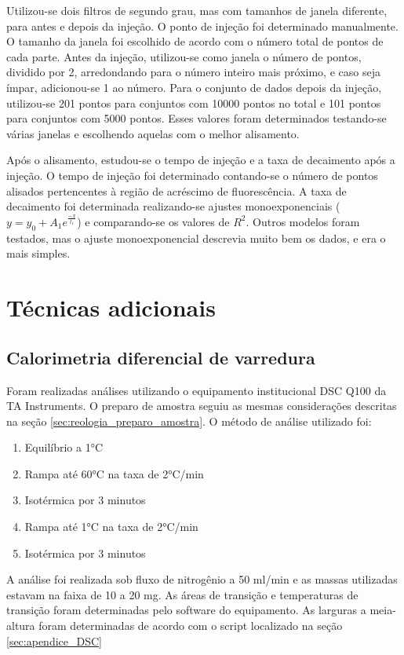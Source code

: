			Utilizou-se dois filtros de segundo grau, mas com tamanhos de janela diferente, para antes e depois da injeção. O ponto de injeção foi determinado manualmente. O tamanho da janela foi escolhido de acordo com o número total de pontos de cada parte. Antes da injeção, utilizou-se como janela o número de pontos, dividido por 2, arredondando para o número inteiro mais próximo, e caso seja ímpar, adicionou-se 1 ao número. Para o conjunto de dados depois da injeção, utilizou-se 201 pontos para conjuntos com 10000 pontos no total e 101 pontos para conjuntos com 5000 pontos. Esses valores foram determinados testando-se várias janelas e escolhendo aquelas com o melhor alisamento.
			
			Após o alisamento, estudou-se o tempo de injeção e a taxa de decaimento após a injeção. O tempo de injeção foi determinado contando-se o número de pontos alisados pertencentes à região de acréscimo de fluorescência. A taxa de decaimento foi determinada realizando-se ajustes monoexponenciais ($y = y_0 + A_1 e^{\frac{-x}{t_1}}$) e comparando-se os valores de $R^2$. Outros modelos foram testados, mas o ajuste monoexponencial descrevia muito bem os dados, e era o mais simples.
		
	\chapter{Técnicas adicionais}
		\section{Calorimetria diferencial de varredura}
		
		Foram realizadas análises utilizando o equipamento institucional DSC Q100 da TA Instruments. O preparo de amostra seguiu as mesmas considerações descritas na seção \ref{sec:reologia_preparo_amostra}. O método de análise utilizado foi:
		
		\begin{enumerate}
			\item Equilíbrio a 1°C
			\item Rampa até 60°C na taxa de 2°C/min
			\item Isotérmica por 3 minutos
			\item Rampa até 1°C na taxa de 2°C/min
			\item Isotérmica por 3 minutos
		\end{enumerate}
		
		A análise foi realizada sob fluxo de nitrogênio a 50 ml/min e as massas utilizadas estavam na faixa de 10 a 20 mg. As áreas de transição e temperaturas de transição foram determinadas pelo software do equipamento. As larguras a meia-altura foram determinadas de acordo com o script localizado na seção \ref{sec:apendice_DSC}
		
